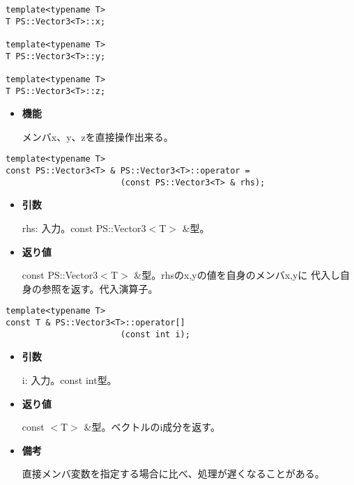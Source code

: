 
\begin{screen}
\begin{verbatim}
template<typename T>
T PS::Vector3<T>::x;

template<typename T>
T PS::Vector3<T>::y;

template<typename T>
T PS::Vector3<T>::z;
\end{verbatim}
\end{screen}

\begin{itemize}
  
\item{{\bf 機能}}
  
  メンバ{x}、{y}、{z}を直接操作出来る。
  
\end{itemize}

\mbox{}

\begin{screen}
\begin{verbatim}
template<typename T>
const PS::Vector3<T> & PS::Vector3<T>::operator = 
                       (const PS::Vector3<T> & rhs);
\end{verbatim}
\end{screen}

\begin{itemize}

\item{{\bf 引数}}

{rhs}: 入力。{const PS::Vector3$<$T$>$ \&}型。

\item{{\bf 返り値}}

{const PS::Vector3$<$T$>$ \&}型。{rhs}のx,yの値を自身のメンバx,yに
代入し自身の参照を返す。代入演算子。

\end{itemize}


\begin{screen}
\begin{verbatim}
template<typename T>
const T & PS::Vector3<T>::operator[]
                       (const int i);
\end{verbatim}
\end{screen}

\begin{itemize}

\item{{\bf 引数}}

{i}: 入力。{const int}型。

\item{{\bf 返り値}}

{const $<$T$>$ \&}型。ベクトルのi成分を返す。

\item{{\bf 備考}}

  直接メンバ変数を指定する場合に比べ、処理が遅くなることがある。

\end{itemize}


